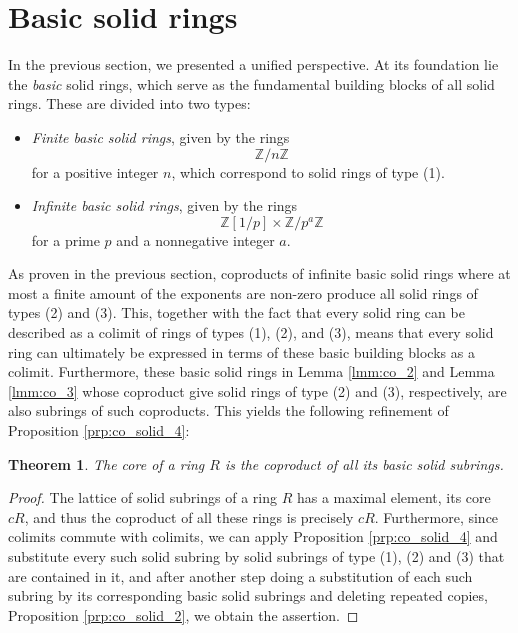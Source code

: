 \documentclass{amsart}
\newtheorem{theorem}[subsection]{Theorem}
\newcommand{\Z}{{\mathbb Z}}
\begin{document}
    \section{Basic solid rings}

    In the previous section, we presented a unified perspective.
    At its foundation lie the \emph{basic} solid rings, which serve as the fundamental building blocks of all solid rings.
    These are divided into two types:

    \begin{itemize}
        \item \emph{Finite basic solid rings}, given by the rings
        $$
        \Z/n\Z
        $$
        for a positive integer $n$, which correspond to solid rings of type (1).

        \item \emph{Infinite basic solid rings}, given by the rings
        $$
        \Z[1/p] \times \Z/p^a\Z
        $$
        for a prime $p$ and a nonnegative integer $a$.
    \end{itemize}

    As proven in the previous section, coproducts of infinite basic solid rings where at most a finite amount of the exponents are non-zero produce all solid rings of types (2) and (3).
    This, together with the fact that every solid ring can be described as a colimit of rings of types (1), (2), and (3), means that every solid ring can ultimately be expressed in terms of these basic building blocks as a colimit.
    Furthermore, these basic solid rings in Lemma \ref{lmm:co_2} and Lemma \ref{lmm:co_3} whose coproduct give solid rings of type (2) and (3), respectively, are also subrings of such coproducts.
    This yields the following refinement of Proposition \ref{prp:co_solid_4}:

    
    \begin{theorem}
    	\label{thm:submain}
    	The core of a ring $R$ is the coproduct of all its basic solid subrings.
    \end{theorem}
    \begin{proof}
    	The lattice of solid subrings of a ring $R$ has a maximal element, its core $cR$, and thus the coproduct of all these rings is precisely $cR$.
    	Furthermore, since colimits commute with colimits, we can apply Proposition \ref{prp:co_solid_4} and substitute every such solid subring by solid subrings of type (1), (2) and (3) that are contained in it, and after another step doing a substitution of each such subring by its corresponding basic solid subrings and deleting repeated copies, Proposition \ref{prp:co_solid_2}, we obtain the assertion.
    \end{proof}
\end{document}
